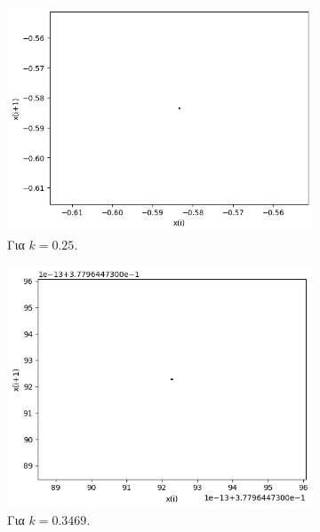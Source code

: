 \begin{figure}[h!]
	\centering
	
	\begin{subfigure}[b]{0.4\textwidth}
		\centering
		\includegraphics[width=\textwidth]{LateX images/graphs q07/g3}
		\caption{Για $k=0.25$.}
		\label{f:k37}
	\end{subfigure}
	\hfill
	\begin{subfigure}[b]{0.4\textwidth}
		\centering
		\includegraphics[width=\textwidth]{LateX images/graphs q07/g4}
		\caption{Για $k=0.3469$.}
		\label{f:k38}
	\end{subfigure}
	\hfill
	\begin{subfigure}[b]{0.4\textwidth}

\end{subfigure}
\end{figure}
